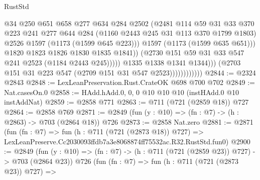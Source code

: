 \begin{lexlean}{RustStd}
\begin{coremodule}
                                          @34
                                          @250
                                          @651
                                          @658
                                          @277
                                          @634
                                          @284
                                          @2502
                                          (@2481
                                            @114
                                            @59
                                            @31
                                            @33
                                            @370
                                            @223
                                            @241
                                            @277
                                            @644
                                            @284
                                            (@1160 @2443 @245 @31 @113 @370 @1799 @1803)
                                            @2526
                                            @1597
                                            (@1173 (@1599 @645 @223)))
                                          @1597
                                          (@1173 (@1599 @635 @651)))
                                        @1820
                                        @1823
                                        @1826
                                        @1830
                                        @1835
                                        @1841))
                                    (@2730 @151 @59 @31 @33 @547 @241 @2523 (@1184 @2443 @245)))))
                              @1335
                              @1338
                              @1341
                              @1344)))
                        (@2703 @151 @31 @223 @547 (@2709 @151 @31 @547 @2523))))))))))))
@2844 := @2324 @2843
@2848 := LexLeanPreservation.Rust.CrateOK @698 @700 @702
@2849 := Nat.casesOn.{0}
@2858 := HAdd.hAdd.{0, 0, 0} @10 @10 @10 (instHAdd.{0} @10 instAddNat)
@2859 := @2858 @771
@2863 := @711 (@721 (@2859 @18)) @727
@2864 := @2858 @769
@2871 := @2849 (fun (y : @10) => (fn : @7) -> (h : @2863) -> @703 (@2864 @18)) @726
@2873 := @2858 Nat.zero
@2881 := @2871
    (fun (fn : @7) =>
    fun (h : @711 (@721 (@2873 @18)) @727) =>
    LexLeanPreserve.Cc2030093ffdb7a3e8068874ff75532ac.R32.RustStd.fun0)
@2900 := @2849
    (fun (y : @10) => (fn : @7) -> (h : @711 (@721 (@2859 @23)) @727) -> @703 (@2864 @23))
    @726
    (fun (fn : @7) =>
    fun (h : @711 (@721 (@2873 @23)) @727) =>

\end{coremodule}
\end{lexlean}
